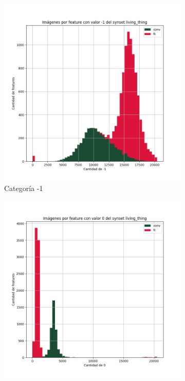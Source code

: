 \documentclass[12,twoside]{TFG-GM}
\theoremstyle{definition}
\theoremstyle{remark}
\begin{document}
\begin{figure}[ht] 
	\centering
	\begin{subfigure}[b]{0.3\textwidth}
		\includegraphics[width=\textwidth] {Images/plots/25/synsets/Images_per_feature_of_-1_category_living_thingall_layers.png}
		\caption{Categoría -1}
	\end{subfigure}
	\begin{subfigure}[b]{0.3\textwidth}
		\includegraphics[width=\textwidth]  {Images/plots/25/synsets/Images_per_feature_of_0_category_living_thingall_layers.png}

\end{subfigure}
\end{figure}
\end{document}
